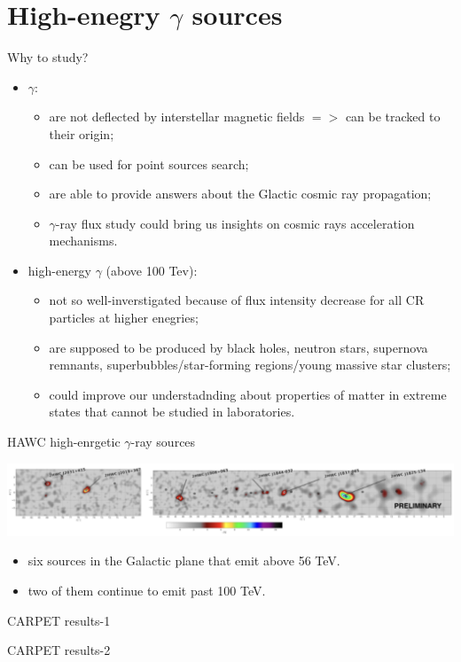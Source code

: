 
\begin{frame}
\titlepage
\end{frame}

\section{High-enegry $\gamma$ sources}

\begin{frame}{Why to study?}
  \begin{itemize}
    \item $\gamma$:
    \begin{itemize}
	\item are not deflected by interstellar magnetic fields $=>$ can be tracked to their origin;
	\item can be used for point sources search;
	\item are able to provide answers about the Glactic cosmic ray propagation;
	\item $\gamma$-ray flux study could bring us insights on cosmic rays acceleration mechanisms.
    \end{itemize}
    \item high-energy $\gamma$ (above 100 Tev):
    \begin{itemize}
	\item not so well-inverstigated because of flux intensity decrease for all CR particles at higher enegries;
	\item are supposed to be produced by black holes, neutron stars, supernova remnants, superbubbles/star-forming
	regions/young massive star clusters;
	\item could improve our understadnding about properties of matter in extreme states that cannot be studied in laboratories.
    \end{itemize}
  \end{itemize}
\end{frame}

\begin{frame}{HAWC high-enrgetic $\gamma$-ray sources}

  \includegraphics[width=1\textwidth]{pics/HWC_above_56Tev.pdf}

\begin{itemize}
  \item six sources in the Galactic plane that emit above 56 TeV. 
  \item two of them continue to emit past 100 TeV. 
\end{itemize}

\end{frame}

\begin{frame}{CARPET results-1}
 
\end{frame}

\begin{frame}{CARPET results-2}
 
\end{frame}
